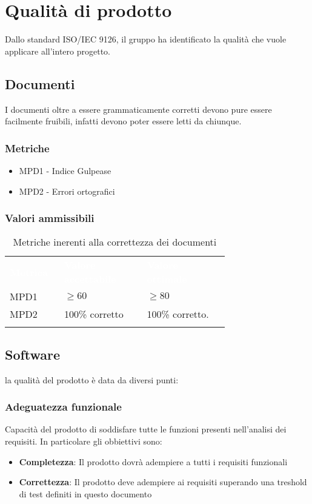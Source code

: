\section{Qualità di prodotto}
Dallo standard ISO/IEC 9126, il gruppo ha identificato la qualità che vuole applicare all'intero progetto.
\subsection{Documenti}
I documenti oltre a essere grammaticamente corretti devono pure essere facilmente fruibili, infatti devono 
poter essere letti da chiunque.
\subsubsection{Metriche}
\begin{itemize}
    \item MPD1 - Indice Gulpease
    \item MPD2 - Errori ortografici
\end{itemize}
\subsubsection{Valori ammissibili}
{\renewcommand{\arraystretch}{1.5}
\begin{longtable}{p{0.12\linewidth}p{0.30\linewidth}p{0.30\linewidth}}
	\rowcolor[RGB]{33, 73, 50}
	\textcolor{white}{\textbf{Metrica}} & \textcolor{white}{\textbf{Valore accettabile}} & \textcolor{white}{\textbf{Valore ottimale}}\\
    \rowcolor[RGB]{216, 235, 171}
    MPD1 & $ \geq 60$ & $ \geq 80$\\
    \rowcolor[RGB]{233, 245, 206}
    MPD2 & 100\% corretto & 100\% corretto.\\ 
    \caption{Metriche inerenti alla correttezza dei documenti}
\end{longtable}	
}
\subsection{Software}
la qualità del prodotto è data da diversi punti:
\subsubsection{Adeguatezza funzionale}
Capacità del prodotto di soddisfare tutte le funzioni presenti nell'analisi dei requisiti. In particolare gli obbiettivi sono:
\begin{itemize}
    \item \textbf{Completezza}: Il prodotto dovrà adempiere a tutti i requisiti funzionali
    \item \textbf{Correttezza}: Il prodotto deve adempiere ai requisiti superando una treshold di test definiti in questo documento
\end{itemize}    

